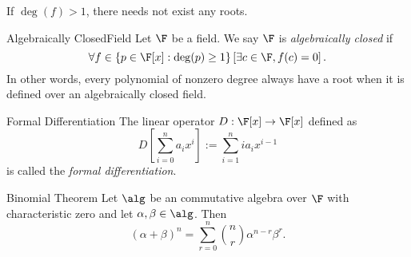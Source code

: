 \documentclass[linearalgebraII]{subfiles}
\begin{document}
    \begin{remark}
        If $\deg(f)>1$, there needs not exist any roots.
    \end{remark}

    \begin{definition}{Algebraically Closed}{Field}
        Let $\F$ be a field. We say $\F$ is \emph{algebraically closed} if
        \begin{equation*}
            \forall f\in \left\lbrace p\in\F[x]: \deg(p)\geq 1 \right\rbrace \left[ \exists c\in \F, f(c) = 0 \right]. 
        \end{equation*}
        In other words, every polynomial of nonzero degree always have a root when it is defined over an algebraically closed field.
    \end{definition}

    \begin{definition}{Formal Differentiation}{}
        The linear operator $D: \F[x]\to \F[x]$ defined as
        \begin{equation*}
            D \left[ \sum^n_{i=0} a_ix^i \right] := \sum^n_{i=1} ia_ix^{i-1} 
        \end{equation*}
        is called the \emph{formal differentiation}.
    \end{definition}

    \begin{theorem}{Binomial Theorem}
        Let $\alg$ be an commutative algebra over $\F$ with characteristic zero and let $\alpha, \beta \in \alg$. Then
        \begin{equation*}
            (\alpha + \beta)^n = \sum^n_{r=0} \binom{n}{r} \alpha^{n-r}\beta^r.
        \end{equation*}
    \end{theorem}
\end{document}
